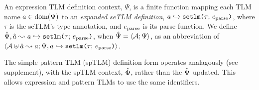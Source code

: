 \documentclass[acmsmall,review,anonymous]{acmart}\settopmatter{printfolios=true,printccs=false,printacmref=false}
\begin{document}



An {expression TLM definition context}, $\Psi$, is a finite function mapping each TLM name $a \in \text{dom}(\Psi)$ to an \emph{expanded seTLM definition}, $a \hookrightarrow \texttt{setlm}\texttt{(}\tau;\,e_\text{parse}\texttt{)}$, where $\tau$ is the seTLM's type annotation, and $e_\text{parse}$ is its parse function. 
We define $\hat{\Psi}, \hat{a} \leadsto a \hookrightarrow \texttt{setlm}\texttt{(}\tau;\,e_\text{parse}\texttt{)}$, when $\hat{\Psi}=\langle \mathcal{A}; \Psi \rangle$, as an abbreviation of $\langle \mathcal{A} \uplus \hat{a} \leadsto a; \Psi, a \hookrightarrow \texttt{setlm}\texttt{(}\tau;\,e_\text{parse}\texttt{)} \rangle$.




The simple pattern TLM (spTLM) definition form operates analagously (see supplement), with the spTLM context, $\hat\Phi$, rather than the $\hat{\Psi}$ updated. This allows expression and pattern TLMs to use the same identifiers.

\end{document}
